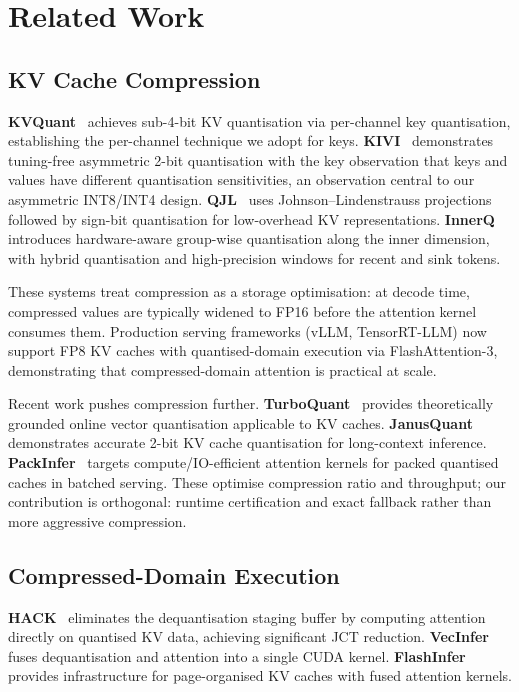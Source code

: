 \documentclass[10pt,twocolumn,a4paper]{article}
\theoremstyle{definition}
\theoremstyle{remark}
\begin{document}
\section{Related Work}
\label{sec:related}

\subsection{KV Cache Compression}

\textbf{KVQuant}~\cite{kvquant} achieves sub-4-bit KV quantisation via per-channel key quantisation, establishing the per-channel technique we adopt for keys.  \textbf{KIVI}~\cite{kivi} demonstrates tuning-free asymmetric 2-bit quantisation with the key observation that keys and values have different quantisation sensitivities, an observation central to our asymmetric INT8/INT4 design.  \textbf{QJL}~\cite{qjl} uses Johnson--Lindenstrauss projections followed by sign-bit quantisation for low-overhead KV representations.  \textbf{InnerQ}~\cite{innerq} introduces hardware-aware group-wise quantisation along the inner dimension, with hybrid quantisation and high-precision windows for recent and sink tokens.

These systems treat compression as a storage optimisation: at decode time, compressed values are typically widened to FP16 before the attention kernel consumes them.  Production serving frameworks (vLLM, TensorRT-LLM) now support FP8 KV caches with quantised-domain execution via FlashAttention-3, demonstrating that compressed-domain attention is practical at scale.

Recent work pushes compression further.  \textbf{TurboQuant}~\cite{turboquant} provides theoretically grounded online vector quantisation applicable to KV caches.  \textbf{JanusQuant}~\cite{janusquant} demonstrates accurate 2-bit KV cache quantisation for long-context inference.  \textbf{PackInfer}~\cite{packinfer} targets compute/IO-efficient attention kernels for packed quantised caches in batched serving.  These optimise compression ratio and throughput; our contribution is orthogonal: runtime certification and exact fallback rather than more aggressive compression.

\subsection{Compressed-Domain Execution}

\textbf{HACK}~\cite{hack} eliminates the dequantisation staging buffer by computing attention directly on quantised KV data, achieving significant JCT reduction.  \textbf{VecInfer}~\cite{vecinfer} fuses dequantisation and attention into a single CUDA kernel.  \textbf{FlashInfer}~\cite{flashinfer} provides infrastructure for page-organised KV caches with fused attention kernels.
\end{document}
